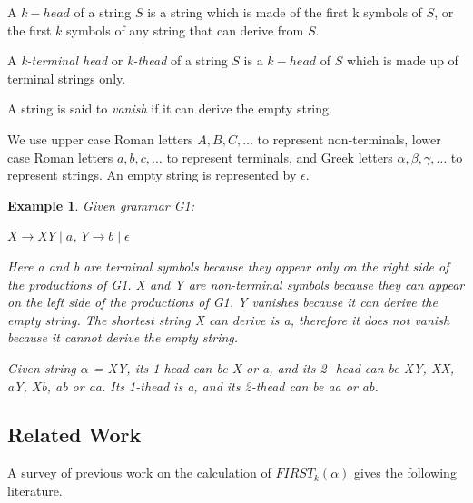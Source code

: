 \documentclass{sig-alternate-05-2015}
\newtheorem{SampleEnv}{Example}[section]
\begin{document}
A \textit{$k-head$} of a string $S$ is a string which is made of the
first k symbols of $S$, or the first $k$ symbols of any string
that can derive from $S$.

A \textit{k-terminal head} or \textit{k-thead} of a string $S$ is a $k-head$ of
$S$ which is made up of terminal strings only.

A string is said to \textit{vanish} if it can derive the empty
string.

We use upper case Roman letters $A, B, C, …$ to represent
non-terminals, lower case Roman letters $a, b, c, …$ to
represent terminals, and Greek letters $α, β, γ, …$ to represent
strings. An empty string is represented by $\epsilon$.

\begin{SampleEnv}

Given grammar G1: 

$X\rightarrow XY \mid a$, $Y\rightarrow b\mid \epsilon$

Here a and b are terminal symbols because they appear
only on the right side of the productions of G1. X and Y are
non-terminal symbols because they can appear on the left
side of the productions of G1.
Y vanishes because it can derive the empty string. The
shortest string X can derive is a, therefore it does not vanish
because it cannot derive the empty string.

Given string $\alpha$ = XY, its 1-head can be X or a, and its 2-
head can be XY, XX, aY, Xb, ab or aa. Its 1-thead is a, and
its 2-thead can be aa or ab.
\end{SampleEnv}



\subsection{Related Work}
A survey of previous work on the calculation of $FIRST_k(\alpha)$
gives the following literature.
\end{document}
